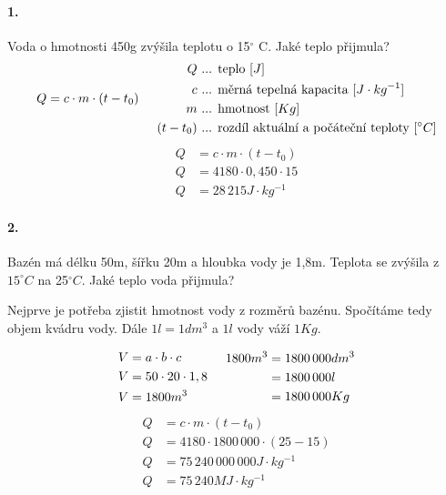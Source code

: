 \documentclass[12pt]{article}
\begin{document}
\paragraph{1.}
Voda o hmotnosti 450g zvýšila teplotu o 15$^\circ$ C. Jaké teplo přijmula?
\begin{equation}
\begin{split}
\nonumber
Q=c\cdot m\cdot (t-t_0)\\
\end{split}
\hspace{0,5cm}
\nonumber
\begin{split}
Q&\text{ ... teplo }[J]\\
c&\text{ ... měrná tepelná kapacita }[J\cdot kg^{-1}]\\
m&\text{ ... hmotnost }[Kg]\\
(t-t_0)&\text{ ... rozdíl aktuální a počáteční teploty }[^\circ C]
\end{split}
\end{equation}
\begin{equation}
\begin{split}
\nonumber
Q&=c\cdot m\cdot (t-t_0)\\
Q&=4180 \cdot 0,450 \cdot 15\\
Q&=28\, 215J\cdot kg^{-1}
\end{split}
\end{equation}

\paragraph{2.}
Bazén má délku 50m, šířku 20m a hloubka vody je 1,8m. Teplota se zvýšila z $15^\circ C$ na 25$^\circ C$. Jaké teplo voda přijmula?

Nejprve je potřeba zjistit hmotnost vody z rozměrů bazénu. Spočítáme tedy objem kvádru vody. Dále $1l=1dm^3$ a $1l$ vody váží $1Kg$.

\begin{equation}
\begin{split}
\nonumber
V&=a \cdot b \cdot c\\
V&=50\cdot 20 \cdot 1,8\\
V&=1800m^3
\end{split}
\hspace{0,5cm}
\begin{split}
\nonumber
1800m^3 &= 1800\, 000dm^3 \\
&= 1800\, 000l\\ 
&= 1800\, 000Kg\\
\end{split}
\end{equation}
\begin{equation}
\begin{split}
\nonumber
Q&=c\cdot m\cdot (t-t_0)\\
Q&=4180 \cdot 1800\, 000 \cdot (25-15)\\
Q&=75\, 240\, 000\, 000J\cdot kg^{-1}\\
Q&=75\, 240MJ\cdot kg^{-1}\\
\end{split}
\end{equation}
\end{document}
